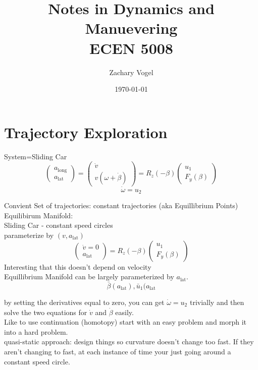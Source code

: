 \documentclass{article}
\author{Zachary Vogel}
\title{Notes in Dynamics and Manuevering\\ ECEN 5008}
\date{\today}
\begin{document}
\maketitle
\section{Trajectory Exploration}
System=Sliding Car
\[\begin{pmatrix}a_{\text{long}}\\a_{\text{lat}}\end{pmatrix}=\begin{pmatrix}\dot{v}\\v(\omega+\dot{\beta})\end{pmatrix}=R_z(-\beta)\begin{pmatrix}u_1\\F_y(\beta)\end{pmatrix}\]
\[\dot{\omega}=u_2\]

Convient Set of trajectories: constant trajectories (aka Equillibrium Points)\\
Equilibirum Manifold:\\
Sliding Car - constant speed circles\\
parameterize by $(v,a_{\text{lat}})$\\
\[\begin{pmatrix}\dot{v}=0\\a_{\text{lat}}\end{pmatrix}=R_z(-\beta)\begin{pmatrix}u_1\\F_y(\beta)\end{pmatrix}\]
Interesting that this doesn't depend on velocity\\
Equillibrium Manifold can be largely parameterized by $a_{\text{lat}}$.\\
\[\bar{\beta}(a_{\text{lat}}), \bar{u}_1(a_{\text{lat}}\]

by setting the derivatives equal to zero, you can get $\dot{\omega}=u_2$ trivially and then solve the two equations for $\dot{v}$ and $\dot{\beta}$ easily.\\

Like to use continuation (homotopy) start with an easy problem and morph it into a hard problem.\\

quasi-static approach: design things so curvature doesn't change too fast. If they aren't changing to fast, at each instance of time your just going around a constant speed circle.
\end{document}
